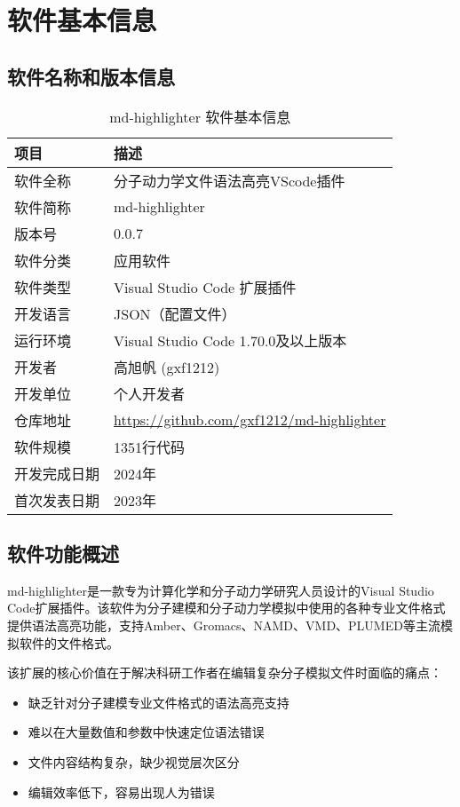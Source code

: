 
\section{软件基本信息}

\subsection{软件名称和版本信息}

\begin{table}[h]
\centering
\caption{md-highlighter 软件基本信息}
\begin{tabular}{p{3cm}p{10cm}}
\toprule
\textbf{项目} & \textbf{描述} \\
\midrule
软件全称 & 分子动力学文件语法高亮VScode插件 \\
软件简称 & md-highlighter \\
版本号 & 0.0.7 \\
软件分类 & 应用软件 \\
软件类型 & Visual Studio Code 扩展插件 \\
开发语言 & JSON（配置文件）\\
运行环境 & Visual Studio Code 1.70.0及以上版本 \\
开发者 & 高旭帆 (gxf1212) \\
开发单位 & 个人开发者 \\
仓库地址 & \href{https://github.com/gxf1212/md-highlighter}{https://github.com/gxf1212/md-highlighter} \\
软件规模 & 1351行代码 \\
开发完成日期 & 2024年 \\
首次发表日期 & 2023年 \\
\bottomrule
\end{tabular}
\end{table}

\subsection{软件功能概述}

md-highlighter是一款专为计算化学和分子动力学研究人员设计的Visual Studio Code扩展插件。该软件为分子建模和分子动力学模拟中使用的各种专业文件格式提供语法高亮功能，支持Amber、Gromacs、NAMD、VMD、PLUMED等主流模拟软件的文件格式。

该扩展的核心价值在于解决科研工作者在编辑复杂分子模拟文件时面临的痛点：
\begin{itemize}
    \item 缺乏针对分子建模专业文件格式的语法高亮支持
    \item 难以在大量数值和参数中快速定位语法错误
    \item 文件内容结构复杂，缺少视觉层次区分
    \item 编辑效率低下，容易出现人为错误
\end{itemize}

